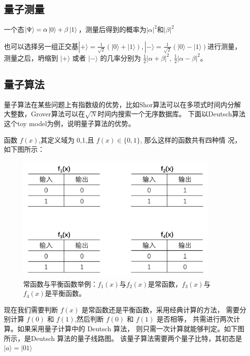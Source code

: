 \documentclass[a4paper,UTF8]{ctexart}
\begin{document}
\subsection{量子测量}

一个态$\ket{\Psi} = \alpha \ket{0} + \beta \ket{1}$，测量后得到的概率为$|\alpha|^2$和$|\beta|^2$

也可以选择另一组正交基$|+\rangle=\frac{1}{\sqrt{2}}(|0\rangle+|1\rangle),|-\rangle=\frac{1}{\sqrt{2}}(|0\rangle-|1\rangle)$进行测量，
测量之后，坍缩到 $|+\rangle$ 或者 $|-\rangle$ 的几率分别为 $\frac12|\alpha+\beta|^2,~\frac12|\alpha-\beta|^2$。

\subsection{量子算法}

量子算法在某些问题上有指数级的优势，比如Shor算法可以在多项式时间内分解大整数，Grover算法可以在$\sqrt{N}$时间内搜索一个无序数据库。
下面以Deutsch算法这个toy model为例，说明量子算法的优势。

函数 $f(x)$,其定义域为 {0,1},且 $f(x)\in\{0,1\}$, 那么这样的函数共有四种情
况，如下图所示：

\begin{figure}[H]
    \centering
    \begin{minipage}[b]{0.9\textwidth}
        \centering
        \includegraphics[width=0.9\textwidth]{./fig2.jpg}
        \caption{常函数与平衡函数举例：$f_1(x)$与$f_2(x)$是常函数，$f_3(x)$与$f_4(x)$是平衡函数。}
    \end{minipage}
\end{figure}

现在我们需要判断 $f(x)$ 是常函数还是平衡函数，采用经典计算的方法，
需要分别计算 $f(0)$ 和 $f(1)$,然后判断 $f(0)$ 和 $f(1)$ 是否相等，
共需进行两次计算。如果采用量子计算中的 Deutsch 算法，
则只需一次计算就能够判定。如下图所示，是Deutsch 算法的量子线路图。
该量子算法需要两个量子比特，其初态是 $|a\rangle=|01\rangle$
\end{document}
